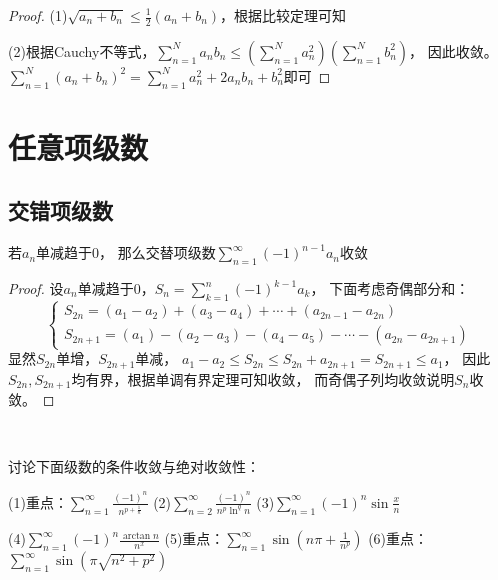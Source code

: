 \begin{proof}
  (1)$\sqrt{a_n + b_n} \leq \frac{1}{2}(a_n + b_n)$，根据比较定理可知

  (2)根据Cauchy不等式，$\sum\limits_{n = 1}^{N} a_nb_n \leq \left( \sum\limits_{n = 1}^Na_n^2 \right) \left( \sum\limits_{n = 1}^N b_n^2 \right)$，
  因此收敛。
  $\sum\limits_{n = 1}^N (a_n+b_n)^2 = \sum\limits_{n = 1}^N a_n^2 + 2a_nb_n + b_n^2$即可
\end{proof}

\section{任意项级数}

\subsection{交错项级数}

\begin{theorem}[Leibniz判别法]
  若$a_n$单减趋于$0$，
  那么交替项级数$\sum\limits_{n= 1}^{\infty}(-1)^{n-1}a_n$收敛
\end{theorem}

\begin{proof}
  设$a_n$单减趋于$0$，$S_n = \sum\limits_{k = 1}^n (-1)^{k-1}a_k$，
  下面考虑奇偶部分和：
  \begin{equation*}
    \begin{cases}
      S_{2n} = (a_1 - a_2) + (a_3 - a_4) + \cdots + (a_{2n-1} - a_{2n})\\
      S_{2n+1} = (a_1) - (a_2 - a_3) - (a_4 - a_5) - \cdots - (a_{2n} - a_{2n+1})
    \end{cases}
  \end{equation*}
  显然$S_{2n}$单增，$S_{2n+1}$单减，
  $a_1 - a_2 \leq S_{2n} \leq S_{2n} + a_{2n+1} = S_{2n+1} \leq a_1$，
  因此$S_{2n},S_{2n+1}$均有界，根据单调有界定理可知收敛，
  而奇偶子列均收敛说明$S_n$收敛。
\end{proof}

~

\begin{exercise}
  讨论下面级数的条件收敛与绝对收敛性：

  (1)重点：$\sum\limits_{n = 1}^{\infty} \frac{(-1)^n}{n^{p + \frac{1}{n}}}$
  (2)$\sum\limits_{n = 2}^{\infty}\frac{(-1)^n}{n^p \ln^q n}$
  (3)$\sum\limits_{n = 1}^{\infty}(-1)^n \sin \frac{x}{n}$

  (4)$\sum\limits_{n =1 }^{\infty}(-1)^n \frac{\arctan n}{n^x}$
  (5)重点：$\sum\limits_{n = 1}^{\infty} \sin (n \pi + \frac{1}{n^p})$
  (6)重点：$\sum\limits_{n = 1}^{\infty} \sin (\pi \sqrt{n^2 + p^2})$
\end{exercise}

